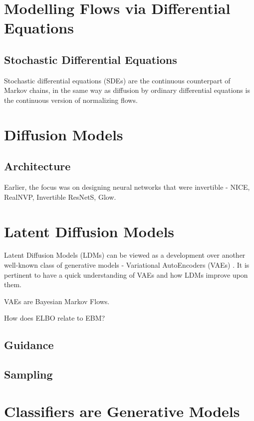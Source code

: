\documentclass[a4paper, 11pt]{article}
\begin{document}
\section{Modelling Flows via Differential Equations}

\subsection{Stochastic Differential Equations}
Stochastic differential equations (SDEs) are the continuous counterpart of Markov chains, in the same way
as diffusion by ordinary differential equations is the continuous version of normalizing flows.

\section{Diffusion Models}


\subsection{Architecture}
Earlier, the focus was on designing neural networks that were invertible - NICE, RealNVP, Invertible ResNetS, Glow.

\section{Latent Diffusion Models}

Latent Diffusion Models (LDMs) can be viewed as a development over another well-known class of generative models - Variational AutoEncoders (VAEs) \cite{dieleman2023perspectives}. It is pertinent to have a quick understanding of VAEs and how LDMs improve upon them.

VAEs are Bayesian Markov Flows.

How does ELBO relate to EBM? 



\subsection{Guidance}

\subsection{Sampling}


\section{Classifiers are Generative Models}
\end{document}
